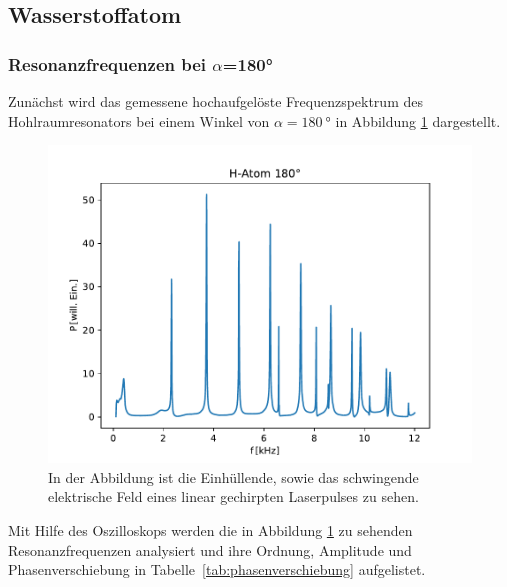     \subsection{Wasserstoffatom}
        \subsubsection*{Resonanzfrequenzen bei $\alpha$=180°}
            Zunächst wird das gemessene hochaufgelöste Frequenzspektrum des Hohlraumresonators bei einem Winkel von $\alpha=\SI{180}{\degree}$ in Abbildung \ref{fig:hatom_180} dargestellt.
            \begin{figure}
                \centering
                \includegraphics[scale=0.7]{./pictures/hatom_180.pdf}
                \caption{In der Abbildung ist die Einhüllende, sowie das schwingende elektrische Feld eines linear gechirpten Laserpulses zu sehen.}
                \label{fig:hatom_180}
            \end{figure}

            \FloatBarrier
            Mit Hilfe des Oszilloskops werden die in Abbildung \ref{fig:hatom_180} zu sehenden Resonanzfrequenzen analysiert und ihre Ordnung, Amplitude und Phasenverschiebung in Tabelle~\ref{tab:phasenverschiebung} 
            aufgelistet.
            \FloatBarrier
        \newpage

